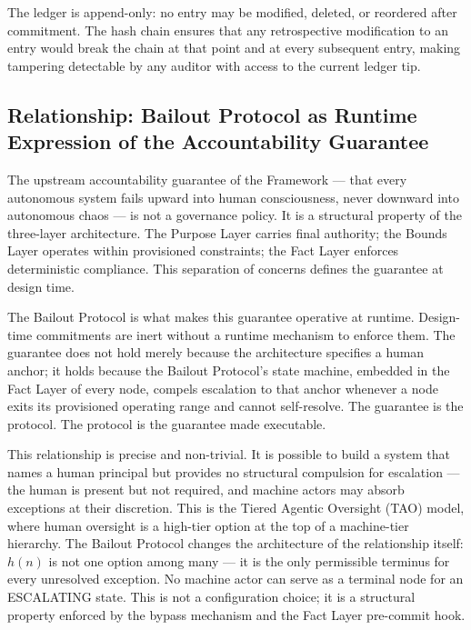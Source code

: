 The ledger is append-only: no entry may be modified, deleted, or reordered after commitment. The hash chain ensures that any retrospective modification to an entry would break the chain at that point and at every subsequent entry, making tampering detectable by any auditor with access to the current ledger tip.

\subsection{Relationship: Bailout Protocol as Runtime Expression of the Accountability Guarantee}
\label{sec:impl:runtime-expression}

The upstream accountability guarantee of the \bxthree{} Framework — that every autonomous system fails upward into human consciousness, never downward into autonomous chaos — is not a governance policy. It is a structural property of the three-layer architecture. The Purpose Layer carries final authority; the Bounds Layer operates within provisioned constraints; the Fact Layer enforces deterministic compliance. This separation of concerns defines the guarantee at design time.

The Bailout Protocol is what makes this guarantee operative at runtime. Design-time commitments are inert without a runtime mechanism to enforce them. The guarantee does not hold merely because the architecture specifies a human anchor; it holds because the Bailout Protocol's state machine, embedded in the Fact Layer of every node, compels escalation to that anchor whenever a node exits its provisioned operating range and cannot self-resolve. The guarantee is the protocol. The protocol is the guarantee made executable.

This relationship is precise and non-trivial. It is possible to build a system that names a human principal but provides no structural compulsion for escalation — the human is present but not required, and machine actors may absorb exceptions at their discretion. This is the Tiered Agentic Oversight (TAO) model, where human oversight is a high-tier option at the top of a machine-tier hierarchy. The Bailout Protocol changes the architecture of the relationship itself: $h(n)$ is not one option among many — it is the only permissible terminus for every unresolved exception. No machine actor can serve as a terminal node for an ESCALATING state. This is not a configuration choice; it is a structural property enforced by the bypass mechanism and the Fact Layer pre-commit hook.

